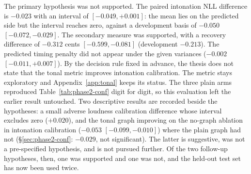 The primary hypothesis was not supported. The paired intonation NLL
difference is $-0.023$ with an interval of $[-0.049, +0.001]$: the mean
lies on the predicted side but the interval reaches zero, against a
development basis of $-0.050$ $[-0.072, -0.029]$. The secondary measure
was supported, with a recovery difference of $-0.312$ cents
$[-0.599, -0.081]$ (development $-0.213$). The predicted timing penalty
did not appear under the given variances ($-0.002$ $[-0.011, +0.007]$).
By the decision rule fixed in advance, the thesis does not state that the
tonal metric improves intonation calibration. The metric stays
exploratory and Appendix~\ref{app:tonal} keeps its status. The three
plain arms reproduced Table~\ref{tab:phase2-conf} digit for digit, so
this evaluation left the earlier result untouched. Two descriptive
results are recorded beside the hypotheses: a small adverse loudness
calibration difference whose interval excludes zero ($+0.020$), and the
tonal graph improving on the no-graph ablation in intonation calibration
($-0.053$ $[-0.099, -0.010]$) where the plain graph had not
(\S\ref{sec:phase2-conf}: $-0.029$, not significant). The latter is
suggestive, was not a pre-specified hypothesis, and is not pursued further. Of
the two follow-up hypotheses, then, one was supported and one was not,
and the held-out test set has now been used twice.

